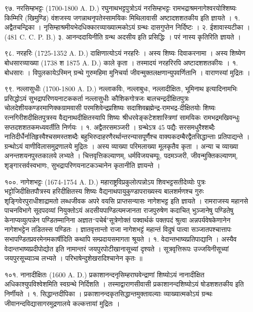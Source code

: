 ९७. नरसिम्हभट्टः (1700-1800 A. D.)
रघुनाथभट्टपुत्रोऽयं नरसिम्हभट्टः रामभद्राश्रमनागेश्वरयोश्शिष्यः किम्मिरि (खिमुण्डि) वंशजस्य जगन्नाथनृपतेस्सामयिकः मिथिलावासी अष्टादशशतकीय इति ज्ञायते ।
१. अद्वैतचन्द्रिका । नृसिम्हाश्रमीयभेदधिक्कारव्याख्यात्मकोऽयं ग्रन्थः दासगुप्तेन निर्दिष्टः ।
२. ईशावास्यटीका । (481 C. C. P. B.) 
३. आनन्ददायिनीति ग्रन्थ अदसीय इति प्रसिद्धिः । परं नास्य कृतिरिति ज्ञायते ।

९८. नरहरिः (1725-1352 A. D.)
दाक्षिणात्योऽयं नरहरिः । अस्य शिष्यः दिवाकरनामा । अस्य शिष्येण बोधसारव्याख्या (1738 श 1875 A. D.) काले कृता । तस्मादयं नरहरिरपि अष्टादशशतकीयः ।
१. बोधसारः । विपुलकायेऽस्मिन् ग्रन्थे गुरुमहिमा मुनिचर्या जीवन्मुक्तलक्षणान्युपवर्णितानि । वाराणस्यां मुद्रितः ।

९९. नल्लासुधीः (1700-1800 A. D.)
नल्लाकविः, नल्लाबुधः, नल्लादीक्षितः, भूमिनाथ इत्यादिनामभिः प्रसिद्धोऽयं सुभद्रापरिणयनाटककर्ता नल्लासुधीः कौशिकगोत्रजः बालचन्द्रदीक्षितपुत्रः चोलदेशीयकण्डरमाणिक्कग्रामवासी परमशिवेन्द्रप्रशिष्यः सदाशिवब्रह्मेन्द्र-रामभद्र-दीक्षितयोः शिष्यः रत्नगिरीशदीक्षितपुत्रस्य वैद्यनाथदीक्षितस्यापि शिष्यः श्रीधरवेङ्कटेशशास्त्रिणां सामयिकः रामभद्रमखिवन्धुः सप्तदशशतकमध्यवर्तीति निर्णयः ।
१. अद्वैतरसमञ्जरी । ग्रन्थेऽत्र 45 पद्यैः सरसमधुरैश्शब्दैः नातिदीर्धैर्नातिहृस्वैश्चसमस्तशब्दैः बहुभिरुदाहरणैरर्थान्तरन्यासपूर्णैश्च वाक्यकदम्बैरद्वैतसिद्धान्ताः प्रतिपाद्यन्ते । ग्रन्थोऽयं वाणीविलासमुद्रणालये मुद्रितः । अस्य व्याख्या परिमलाख्या मूलकृतैव कृता । अन्या च व्याख्या अनन्तशयनपुस्तकालये लभ्यते ।
चित्तवृत्तिकल्याणम्, धर्मविजयचम्पूः, पदमञ्जरी, जीवन्मुक्तिकल्याणम्, शृङ्गारसर्वस्वभाणः, सुभद्रापरिणयनाटकञ्चानेन कृतानीति ज्ञायन्ते ।

१००. नागेशभट्टः (1674-1754 A. D.)
महाराष्ट्रविप्रकुलोत्पन्नोऽय शिवभट्टसतीदेव्योः पुत्रः भट्टोजिदीक्षितपौत्रस्य हरिदीक्षितस्य शिष्यः वैद्यनाथपायुकुण्डापराख्यस्य बालशर्मणश्च गुरुः शृङ्गिवेरपुराधीशाद्रामतो लब्धजीवक अपरे वयसि प्राप्तसन्यासः नागेशभट्ट इति ज्ञायते ।
रामराजस्य महानसे पाचनविभागे सूदपदव्यां नियुक्तोऽयं अदसीयपाण्डित्यमजानता राजपुरुषेण कदाचित् भुञ्जानेषु पण्डितेषु केनाप्यव्युत्पन्नेन पण्डितम्मानिना अज्ञात``पचेर्ब"सूत्रेणोक्तं पक्वार्थकं पक्तपदं श्रुत्वा अन्नपर्यवेषकेणानेन नागेशभट्टेन तडितस्स पण्डितः । ज्ञातवृत्तान्तो राजा नागेशभट्टं महान्तं विदुषं पात्वा सञ्जातपश्चात्तापः सभापण्डितप्रवरमेनमकार्षीदिति कथापि सम्प्रदायसमागता श्रूयते ।
१. वेदान्तभाष्यप्रतिपाद्यानि । अस्यैव वेदान्तभाष्यप्रदीपोद्योत इति नामान्तरं जयपुरपोटीखानासूच्यां दृश्यते । सूत्रवृत्तिरूपः उज्जयिनीसूच्यां जयपुरसूच्याञ्च लभ्यते । परिभाषेन्दुशेखरादिश्चानेन कृतः ॥

१०१. नानादीक्षितः (1600 A. D.)
प्रकाशानन्दनृसिम्हराघवेन्द्राणां शिष्योऽयं नानादीक्षित अधिकाश्युपविश्वेशमिति स्वग्रन्थे निर्दिशति । तस्माद्वाराणसीवासी प्रकाशानन्दशिष्योऽयं षोडशशतकीय इति निर्णीयते ।
१. सिद्धान्तदीपिका । प्रकाशानन्दकृतसिद्धान्तमुक्तावल्याः व्याख्यात्मकोऽयं ग्रन्थः जीवानन्दविद्यासागरमुद्रणालये कल्कत्तायां मुद्रितः ।

